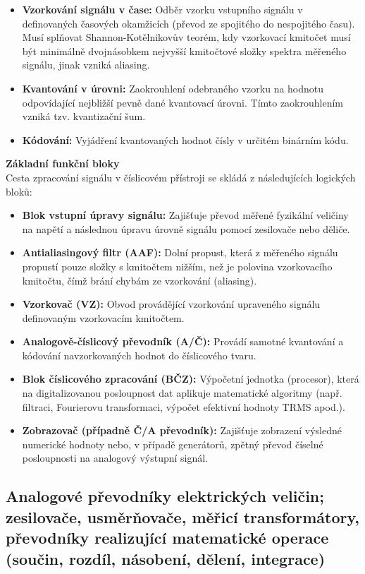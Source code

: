         \begin{itemize}
            \item \textbf{Vzorkování signálu v čase:} Odběr vzorku vstupního signálu v definovaných časových okamžicích (převod ze spojitého do nespojitého času). Musí splňovat Shannon-Kotělnikovův teorém, kdy vzorkovací kmitočet musí být minimálně dvojnásobkem nejvyšší kmitočtové složky spektra měřeného signálu, jinak vzniká aliasing.
            \item \textbf{Kvantování v úrovni:} Zaokrouhlení odebraného vzorku na hodnotu odpovídající nejbližší pevně dané kvantovací úrovni. Tímto zaokrouhlením vzniká tzv. kvantizační šum.
            \item \textbf{Kódování:} Vyjádření kvantovaných hodnot čísly v určitém binárním kódu.
        \end{itemize}
        \textbf{Základní funkční bloky}\\
        Cesta zpracování signálu v číslicovém přístroji se skládá z následujících logických bloků:
        \begin{itemize}
            \item \textbf{Blok vstupní úpravy signálu:} Zajišťuje převod měřené fyzikální veličiny na napětí a následnou úpravu úrovně signálu pomocí zesilovače nebo děliče.
            \item \textbf{Antialiasingový filtr (AAF):} Dolní propust, která z měřeného signálu propustí pouze složky s kmitočtem nižším, než je polovina vzorkovacího kmitočtu, čímž brání chybám ze vzorkování (aliasing).
            \item \textbf{Vzorkovač (VZ):} Obvod provádějící vzorkování upraveného signálu definovaným vzorkovacím kmitočtem.
            \item \textbf{Analogově-číslicový převodník (A/Č):} Provádí samotné kvantování a kódování navzorkovaných hodnot do číslicového tvaru.
            \item \textbf{Blok číslicového zpracování (BČZ):} Výpočetní jednotka (procesor), která na digitalizovanou posloupnost dat aplikuje matematické algoritmy (např. filtraci, Fourierovu transformaci, výpočet efektivní hodnoty TRMS apod.).
            \item \textbf{Zobrazovač (případně Č/A převodník):} Zajišťuje zobrazení výsledné numerické hodnoty nebo, v případě generátorů, zpětný převod číselné posloupnosti na analogový výstupní signál.
        \end{itemize}
\subsection{Analogové převodníky elektrických veličin; zesilovače, usměrňovače, měřicí transformátory, převodníky realizující matematické operace (součin, rozdíl, násobení, dělení, integrace)}
